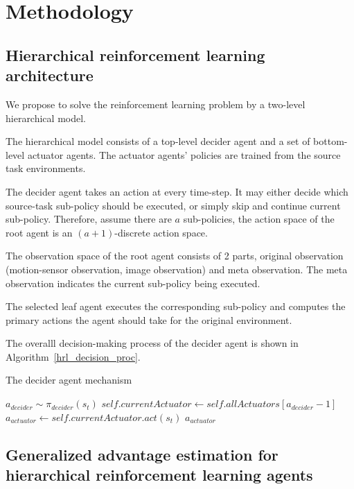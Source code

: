 \chapter{Methodology}


\section{Hierarchical reinforcement learning architecture}
We propose to solve the reinforcement learning problem by a two-level hierarchical model. 

The hierarchical model consists of a top-level decider agent and a set of bottom-level actuator agents. The actuator agents' policies are trained from the source task environments. 

The decider agent takes an action at every time-step. It may either decide which source-task sub-policy should be executed, or simply skip and continue current sub-policy. Therefore, assume there are $a$ sub-policies, the action space of the root agent is an $(a+1)$-discrete action space.

The observation space of the root agent consists of 2 parts, original observation (motion-sensor observation, image observation) and meta observation. The meta observation indicates the current sub-policy being executed.

The selected leaf agent executes the corresponding sub-policy and computes the primary actions the agent should take for the original environment.

 The overalll decision-making process of the decider agent is shown in Algorithm~\ref{hrl_decision_proc}.

\begin{algorithm}
\caption{The decider agent mechanism}\label{hrl_decision_proc}
\begin{algorithmic}%
\State $a_{decider} \sim \pi_{decider}(s_t)$
 \State $self.currentActuator \gets self.allA
ctuators[a_{decider}-1]$
 \EndIf
\State $a_{actuator} \gets self.currentActuator.act(s_t)$
\State \Return $a_{actuator}$
\EndFunction
\end{algorithmic}
\end{algorithm}

\section{Generalized advantage estimation for hierarchical reinforcement learning agents}



